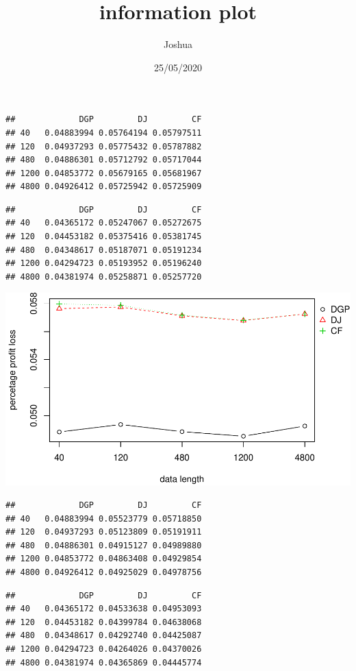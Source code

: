 \documentclass[
]{article}
\title{information plot}
\author{Joshua}
\date{25/05/2020}
\begin{document}
\maketitle

\begin{verbatim}
##             DGP         DJ         CF
## 40   0.04883994 0.05764194 0.05797511
## 120  0.04937293 0.05775432 0.05787882
## 480  0.04886301 0.05712792 0.05717044
## 1200 0.04853772 0.05679165 0.05681967
## 4800 0.04926412 0.05725942 0.05725909
\end{verbatim}

\begin{verbatim}
##             DGP         DJ         CF
## 40   0.04365172 0.05247067 0.05272675
## 120  0.04453182 0.05375416 0.05381745
## 480  0.04348617 0.05187071 0.05191234
## 1200 0.04294723 0.05193952 0.05196240
## 4800 0.04381974 0.05258871 0.05257720
\end{verbatim}

\includegraphics{information-plot_files/figure-latex/AR(1)-1.pdf}

\begin{verbatim}
##             DGP         DJ         CF
## 40   0.04883994 0.05523779 0.05718850
## 120  0.04937293 0.05123809 0.05191911
## 480  0.04886301 0.04915127 0.04989880
## 1200 0.04853772 0.04863408 0.04929854
## 4800 0.04926412 0.04925029 0.04978756
\end{verbatim}

\begin{verbatim}
##             DGP         DJ         CF
## 40   0.04365172 0.04533638 0.04953093
## 120  0.04453182 0.04399784 0.04638068
## 480  0.04348617 0.04292740 0.04425087
## 1200 0.04294723 0.04264026 0.04370026
## 4800 0.04381974 0.04365869 0.04445774
\end{verbatim}
\end{document}
